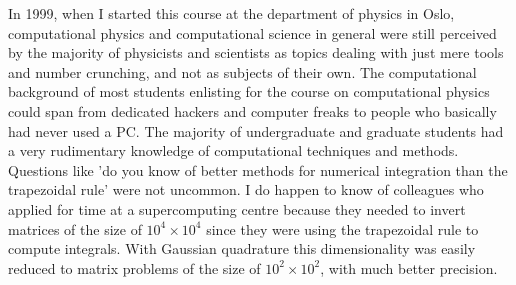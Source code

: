 In 1999, when I started this course at the department of physics in
Oslo, computational physics and computational science in general were
still perceived by the majority of physicists and scientists as topics
dealing with just mere tools and number crunching, and not as subjects
of their own.  The computational background of most students enlisting
for the course on computational physics could span from dedicated
hackers and computer freaks to people who basically had never used a
PC. The majority of undergraduate and graduate students had a very
rudimentary knowledge of computational techniques and methods.
Questions like 'do you know of better methods for numerical
integration than the trapezoidal rule' were not uncommon. I do happen
to know of colleagues who applied for time at a supercomputing centre
because they needed to invert matrices of the size of $10^4\times
10^4$ since they were using the trapezoidal rule to compute
integrals. With Gaussian quadrature this dimensionality was easily
reduced to matrix problems of the size of $10^2\times 10^2$, with much
better precision.

